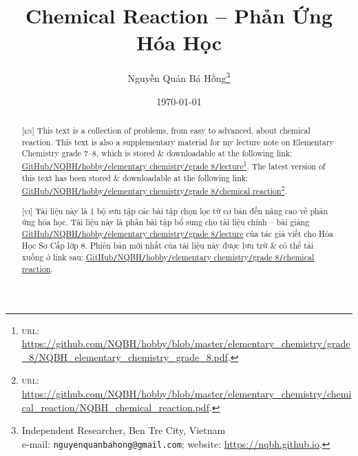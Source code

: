 \documentclass{article}
\title{Chemical Reaction -- Phản Ứng Hóa Học}
\author{Nguyễn Quản Bá Hồng\footnote{Independent Researcher, Ben Tre City, Vietnam\\e-mail: \texttt{nguyenquanbahong@gmail.com}; website: \url{https://nqbh.github.io}.}}
\date{\today}
\numberwithin{equation}{section}
\begin{document}
\maketitle
\begin{abstract}
	\textsc{[en]} This text is a collection of problems, from easy to advanced, about chemical reaction. This text is also a supplementary material for my lecture note on Elementary Chemistry grade 7--8, which is stored \& downloadable at the following link: \href{https://github.com/NQBH/hobby/blob/master/elementary_chemistry/grade_8/NQBH_elementary_chemistry_grade_8.pdf}{GitHub\texttt{/}NQBH\texttt{/}hobby\texttt{/}elementary chemistry\texttt{/}grade 8\texttt{/}lecture}\footnote{\textsc{url}: \url{https://github.com/NQBH/hobby/blob/master/elementary_chemistry/grade_8/NQBH_elementary_chemistry_grade_8.pdf}.}. The latest version of this text has been stored \& downloadable at the following link: \href{https://github.com/NQBH/hobby/blob/master/elementary_chemistry/chemical_reaction/NQBH_chemical_reaction.pdf}{GitHub\texttt{/}NQBH\texttt{/}hobby\texttt{/}elementary chemistry\texttt{/}grade 8\texttt{/}chemical reaction}\footnote{\textsc{url}: \url{https://github.com/NQBH/hobby/blob/master/elementary_chemistry/chemical_reaction/NQBH_chemical_reaction.pdf}.}.
	\vspace{2mm}
	
	\textsc{[vi]} Tài liệu này là 1 bộ sưu tập các bài tập chọn lọc từ cơ bản đến nâng cao về phản ứng hóa học. Tài liệu này là phần bài tập bổ sung cho tài liệu chính -- bài giảng \href{https://github.com/NQBH/hobby/blob/master/elementary_chemistry/grade_8/NQBH_elementary_chemistry_grade_8.pdf}{GitHub\texttt{/}NQBH\texttt{/}hobby\texttt{/}elementary chemistry\texttt{/}grade 8\texttt{/}lecture} của tác giả viết cho Hóa Học Sơ Cấp lớp 8. Phiên bản mới nhất của tài liệu này được lưu trữ \& có thể tải xuống ở link sau: \href{https://github.com/NQBH/hobby/blob/master/elementary_chemistry/grade_8/real/NQBH_real.pdf}{GitHub\texttt{/}NQBH\texttt{/}hobby\texttt{/}elementary chemistry\texttt{/}grade 8\texttt{/}chemical reaction}.
\end{abstract}
\setcounter{secnumdepth}{4}
\setcounter{tocdepth}{3}
\tableofcontents

\end{document}

